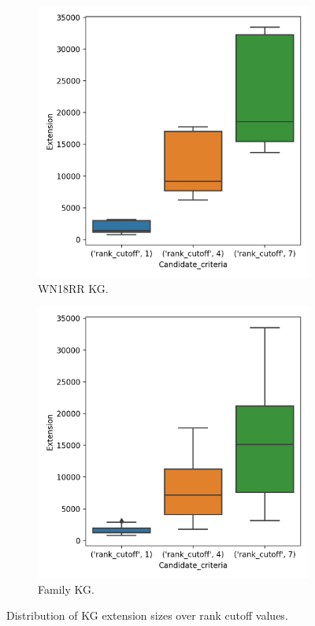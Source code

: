 \begin{figure}[h]
\centering
\begin{subfigure}{.5\textwidth}
  \centering
  \includegraphics[width=1\linewidth]{figures/results/ranks/Extension_size_entity_wn18rr.png}
  \caption{WN18RR KG.}
  \label{fig:rank_extension_wn18rr_boxplot_sub}
\end{subfigure}%
\begin{subfigure}{.5\textwidth}
  \centering
  \includegraphics[width=1\linewidth]{figures/results/ranks/Extension_size_entity_family.png}
  \caption{Family KG.}
  \label{fig:rank_extension_family_boxplot_sub}
\end{subfigure}
\caption{Distribution of KG extension sizes over rank cutoff values.}
\label{rank_extensions_boxplot}
\end{figure}

